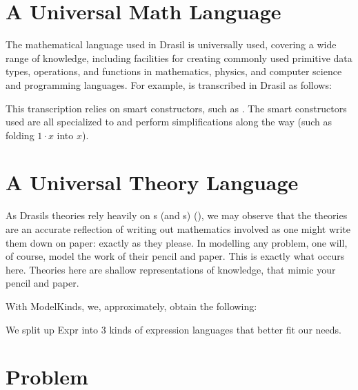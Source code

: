 \section{A Universal Math Language}
\label{sec:modelkinds:language}

\originalExprHaskell

The mathematical language used in Drasil is universally used, covering a wide
range of knowledge, including facilities for creating commonly used primitive
data types, operations, and functions  in mathematics, physics, and computer
science and programming languages. For example,  is
transcribed in Drasil as follows:


This transcription relies on smart constructors, such as . The smart constructors used are
all specialized to \Expr{} and perform simplifications along the way (such
as folding \(1 \cdot x\) into \(x\)).

\section{A Universal Theory Language}

As Drasils theories rely heavily on \Relation{}s (and \RelationConcept{}s)
(), we may observe that the
theories are an accurate reflection of writing out mathematics involved as one
might write them down on paper: exactly as they please. In modelling any
problem, one will, of course, model the work of their pencil and paper. This is
exactly what occurs here. Theories here are shallow representations of
knowledge, that mimic your pencil and paper.


\theoriesWithoutModelKinds

With ModelKinds, we, approximately, obtain the following:

\theoriesWithModelKinds

We split up Expr into 3 kinds of expression languages that better fit our needs.

\section{Problem}

